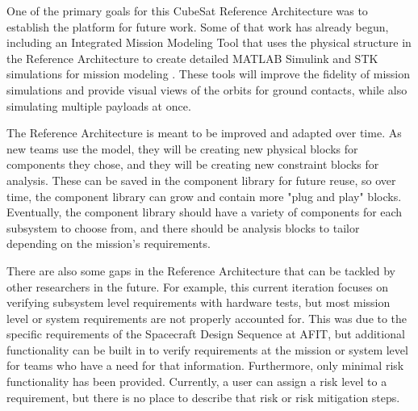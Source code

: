 
One of the primary goals for this CubeSat Reference Architecture was to establish the platform for future work. Some of that work has already begun, including an Integrated Mission Modeling Tool that uses the physical structure in the Reference Architecture to create detailed MATLAB Simulink and STK simulations for mission modeling \citep{Dreyer2021, Brown2021}. These tools will improve the fidelity of mission simulations and provide visual views of the orbits for ground contacts, while also simulating multiple payloads at once.

The Reference Architecture is meant to be improved and adapted over time. As new teams use the model, they will be creating new physical blocks for components they chose, and they will be creating new constraint blocks for analysis. These can be saved in the component library for future reuse, so over time, the component library can grow and contain more "plug and play" blocks. Eventually, the component library should have a variety of components for each subsystem to choose from, and there should be analysis blocks to tailor depending on the mission's requirements. 

There are also some gaps in the Reference Architecture that can be tackled by other researchers in the future. For example, this current iteration focuses on verifying subsystem level requirements with hardware tests, but most mission level or system requirements are not properly accounted for. This was due to the specific requirements of the Spacecraft Design Sequence at AFIT, but additional functionality can be built in to verify requirements at the mission or system level for teams who have a need for that information. Furthermore, only minimal risk functionality has been provided. Currently, a user can assign a risk level to a requirement, but there is no place to describe that risk or risk mitigation steps. 
